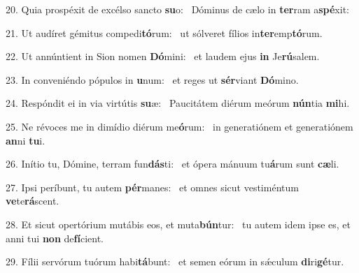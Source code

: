 20. Quia prospéxit de excélso sancto \textbf{su}o: \ast\  Dóminus de cælo in \textbf{ter}ram a\textbf{spé}xit:\

21. Ut audíret gémitus compedi\textbf{tó}rum: \ast\  ut sólveret fílios in\textbf{ter}emp\textbf{tó}rum.\

22. Ut annúntient in Sion nomen \textbf{Dó}mini: \ast\  et laudem ejus \textbf{in} Je\textbf{rú}salem.\

23. In conveniéndo pópulos in \textbf{u}num: \ast\  et reges ut \textbf{sér}viant \textbf{Dó}mino.\

24. Respóndit ei in via virtútis \textbf{su}æ: \ast\  Paucitátem diérum meórum \textbf{nún}tia \textbf{mi}hi.\

25. Ne révoces me in dimídio diérum me\textbf{ó}rum: \ast\  in generatiónem et generatiónem \textbf{an}ni \textbf{tu}i.\

26. Inítio tu, Dómine, terram fun\textbf{dás}ti: \ast\  et ópera mánuum tu\textbf{á}rum sunt \textbf{cæ}li.\

27. Ipsi períbunt, tu autem \textbf{pér}manes: \ast\  et omnes sicut vestiméntum \textbf{ve}te\textbf{rá}scent.\

28. Et sicut opertórium mutábis eos, et muta\textbf{bún}tur: \ast\  tu autem idem ipse es, et anni tui \textbf{non} de\textbf{fí}cient.\

29. Fílii servórum tuórum habi\textbf{tá}bunt: \ast\  et semen eórum in sǽculum \textbf{di}ri\textbf{gé}tur.\

